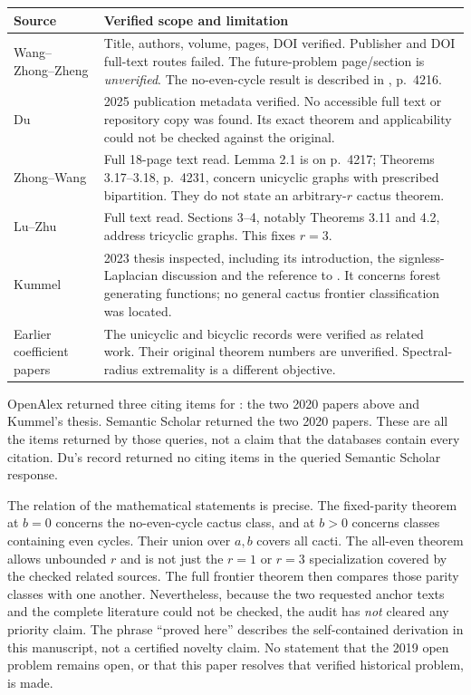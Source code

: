 \documentclass[12pt]{amsart}
\theoremstyle{definition}
\theoremstyle{remark}
\numberwithin{equation}{section}
\begin{document}
\begin{center}\small
\begin{tabular}{p{}p{}}
Source&Verified scope and limitation\\\hline
Wang--Zhong--Zheng \cite{en-wzz}&Title, authors, volume, pages, DOI verified.
Publisher and DOI full-text routes failed. The future-problem page/section
is \emph{unverified}. The no-even-cycle result is described in
\cite{en-zw}, p.~4216.\\
Du \cite{en-du}&2025 publication metadata verified. No accessible full text
or repository copy was found. Its exact theorem and applicability could
not be checked against the original.\\
Zhong--Wang \cite{en-zw}&Full 18-page text read. Lemma 2.1 is on p.~4217;
Theorems 3.17--3.18, p.~4231, concern unicyclic graphs with prescribed
bipartition. They do not state an arbitrary-$r$ cactus theorem.\\
Lu--Zhu \cite{en-lz}&Full text read. Sections 3--4, notably Theorems
3.11 and 4.2, address tricyclic graphs. This fixes $r=3$.\\
Kummel \cite{en-kummel}&2023 thesis inspected, including its introduction,
the signless-Laplacian discussion and the reference to \cite{en-wzz}.
It concerns forest generating functions; no general cactus frontier
classification was located.\\
Earlier coefficient papers&The unicyclic and bicyclic records
\cite{en-lts,en-zz} were verified as related work. Their original theorem
numbers are unverified. Spectral-radius extremality \cite{en-cz} is a
different objective.\\
\end{tabular}
\end{center}

OpenAlex returned three citing items for \cite{en-wzz}: the two 2020
papers above and Kummel's thesis. Semantic Scholar returned the two 2020
papers. These are all the items returned by those queries, not a claim
that the databases contain every citation. Du's record returned no citing
items in the queried Semantic Scholar response.

The relation of the mathematical statements is precise. The fixed-parity
theorem at $b=0$ concerns the no-even-cycle cactus class, and at $b>0$
concerns classes containing even cycles. Their union over $a,b$ covers
all cacti. The all-even theorem allows unbounded $r$ and is not just the
$r=1$ or $r=3$ specialization covered by the checked related sources.
The full frontier theorem then compares those parity classes with one
another. Nevertheless, because the two requested anchor texts and the
complete literature could not be checked, the audit has \emph{not}
cleared any priority claim. The phrase ``proved here'' describes the
self-contained derivation in this manuscript, not a certified novelty
claim. No statement that the 2019 open problem remains open, or that this
paper resolves that verified historical problem, is made.
\end{document}
